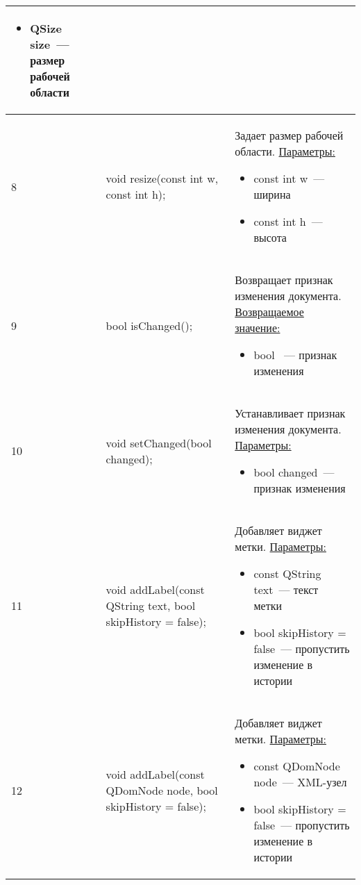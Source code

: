 \begin{longtable}[h]{|p{}|p{}|p{}|}
    \begin{itemize}[nolistsep,label=,leftmargin=0cm]
      \item QSize size~--- размер рабочей области
    \end{itemize}\\ \hline
  8 & void  resize(const int w, const int h); & Задает размер рабочей области.\newline
    \uline{Параметры:}
    \begin{itemize}[nolistsep,label=,leftmargin=0cm]
      \item const int w~--- ширина
      \item const int h~--- высота
    \end{itemize}\\ \hline
  9 & bool isChanged(); & Возвращает признак изменения документа.\newline
    \uline{Возвращаемое значение:}
    \begin{itemize}[nolistsep,label=,leftmargin=0cm]
      \item bool ~--- признак изменения
    \end{itemize}\\ \hline
  10 & void setChanged(bool changed); & Устанавливает признак изменения документа.\newline
    \uline{Параметры:}
    \begin{itemize}[nolistsep,label=,leftmargin=0cm]
      \item bool changed~--- признак изменения
    \end{itemize}\\ \hline
  11 & void addLabel(const QString text,  bool skipHistory = false); & Добавляет виджет метки.\newline
    \uline{Параметры:}
    \begin{itemize}[nolistsep,label=,leftmargin=0cm]
      \item const QString text~--- текст метки
      \item bool skipHistory = false~--- пропустить изменение в истории
    \end{itemize}\\ \hline
  12 & void addLabel(const QDomNode node, bool skipHistory = false); & Добавляет виджет метки.\newline
    \uline{Параметры:}
    \begin{itemize}[nolistsep,label=,leftmargin=0cm]
      \item const QDomNode node~--- XML-узел
      \item bool skipHistory = false~--- пропустить изменение в истории

\end{itemize}
\end{longtable}
